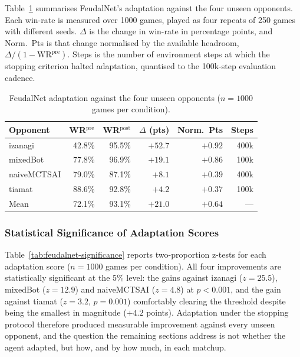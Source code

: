 \documentclass[sigconf,review=false]{acmart}
\begin{document}
Table~\ref{tab:feudalnet-adaptation} summarises FeudalNet's adaptation against the four unseen opponents.
Each win-rate is measured over 1000 games, played as four repeats of 250 games with different seeds.
$\Delta$ is the change in win-rate in percentage points, and Norm.\ Pts is that change normalised by the available headroom, $\Delta/(1-\mathrm{WR}^{\mathrm{pre}})$.
Steps is the number of environment steps at which the stopping criterion halted adaptation, quantised to the 100k-step evaluation cadence.

\begin{table}[t]
  \caption{FeudalNet adaptation against the four unseen opponents ($n = 1000$ games per condition).}
  \label{tab:feudalnet-adaptation}
  \begin{tabular}{lrrrrr}
    \toprule
    Opponent & WR$^{\mathrm{pre}}$ & WR$^{\mathrm{post}}$
             & $\Delta$ (pts) & Norm.\ Pts & Steps \\
    \midrule
    izanagi     & 42.8\% & 95.5\% & $+52.7$ & $+0.92$ & 400k \\
    mixedBot    & 77.8\% & 96.9\% & $+19.1$ & $+0.86$ & 100k \\
    naiveMCTSAI & 79.0\% & 87.1\% &  $+8.1$ & $+0.39$ & 400k \\
    tiamat      & 88.6\% & 92.8\% &  $+4.2$ & $+0.37$ & 100k \\
    \midrule
    Mean        & 72.1\% & 93.1\% & $+21.0$ & $+0.64$ & --- \\
    \bottomrule
  \end{tabular}
\end{table}


\subsubsection{Statistical Significance of Adaptation Scores}
Table~\ref{tab:feudalnet-significance} reports two-proportion z-tests for each adaptation score ($n = 1000$ games per condition). All four improvements are statistically significant at the 5\% level: the gains against izanagi ($z = 25.5$), mixedBot ($z = 12.9$) and naiveMCTSAI ($z = 4.8$) at $p < 0.001$, and the gain against tiamat ($z = 3.2$, $p = 0.001$) comfortably clearing the threshold despite being the smallest in magnitude ($+4.2$ points). 
Adaptation under the stopping protocol therefore produced measurable improvement against every unseen opponent, and the question the remaining sections address is not whether the agent adapted, but how, and by how much, in each matchup.
\end{document}
